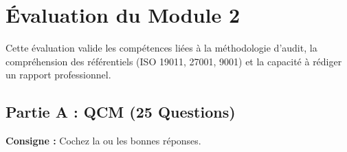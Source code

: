 \chapter{Évaluation du Module 2}
\label{chap:evalmod2}

Cette évaluation valide les compétences liées à la méthodologie d'audit, la compréhension des référentiels (ISO 19011, 27001, 9001) et la capacité à rédiger un rapport professionnel.

\section{Partie A : QCM (25 Questions)}

\textbf{Consigne :} Cochez la ou les bonnes réponses.

